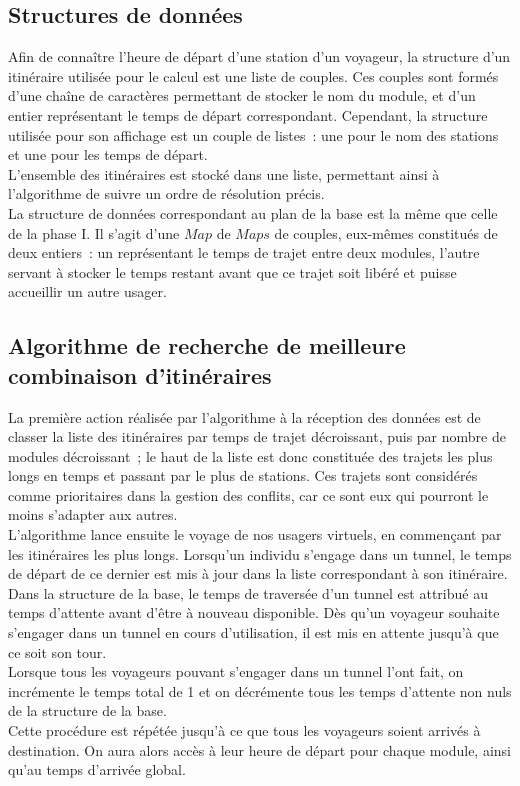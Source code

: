 \documentclass[11pt, a4paper, twoside, titlepage]{article}
\begin{document}
\subsection{Structures de données}

Afin de connaître l'heure de départ d'une station d'un voyageur, la structure d'un itinéraire utilisée pour le calcul est une liste de couples. Ces couples sont formés d'une chaîne de caractères permettant de stocker le nom du module, et d'un entier représentant le temps de départ correspondant. Cependant, la structure utilisée pour son affichage est un couple de listes : une pour le nom des stations et une pour les temps de départ.\\

L'ensemble des itinéraires est stocké dans une liste, permettant ainsi à l'algorithme de suivre un ordre de résolution précis.\\

La structure de données correspondant au plan de la base est la même que celle de la phase I. Il s'agit d'une $Map$ de $Maps$ de couples, eux-mêmes constitués de deux entiers : un représentant le temps de trajet entre deux modules, l'autre servant à stocker le temps restant avant que ce trajet soit libéré et puisse accueillir un autre usager.


\subsection{Algorithme de recherche de meilleure combinaison d'itinéraires}

La première action réalisée par l'algorithme à la réception des données est de classer la liste des itinéraires par temps de trajet décroissant, puis par nombre de modules décroissant ; le haut de la liste est donc constituée des trajets les plus longs en temps et passant par le plus de stations. Ces trajets sont considérés comme prioritaires dans la gestion des conflits, car ce sont eux qui pourront le moins s'adapter aux autres.\\
L'algorithme lance ensuite le voyage de nos usagers virtuels, en commençant par les itinéraires les plus longs. Lorsqu'un individu s'engage dans un tunnel, le temps de départ de ce dernier est mis à jour dans la liste correspondant à son itinéraire. Dans la structure de la base, le temps de traversée d'un tunnel est attribué au temps d'attente avant d'être à nouveau disponible. Dès qu'un voyageur souhaite s'engager dans un tunnel en cours d'utilisation, il est mis en attente jusqu'à que ce soit son tour.\\
Lorsque tous les voyageurs pouvant s'engager dans un tunnel l'ont fait, on incrémente le temps total de 1 et on décrémente tous les temps d'attente non nuls de la structure de la base.\\
Cette procédure est répétée jusqu'à ce que tous les voyageurs soient arrivés à destination. On aura alors accès à leur heure de départ pour chaque module, ainsi qu'au temps d'arrivée global.\\
\end{document}
